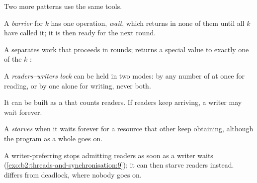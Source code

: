 Two more patterns use the same tools.

\begin{definition}[Barrier]\label{def:b2:threads-and-synchronisation:barrier}
A \emph{barrier} for $k$  has one operation, \emph{wait}, which returns in none of them until all
$k$ have called it; it is then ready for the next round.
\end{definition}

A  separates work that proceeds in rounds;  returns a special value to exactly one of
the $k$ :



\begin{definition}\label{def:b2:threads-and-synchronisation:rwlock}
A \emph{readers--writers lock} can be held in two modes: by any number of  at once
for reading, or by one  alone for writing, never both.
\end{definition}

It can be built as a  that counts readers. If readers keep arriving, a writer may wait forever.

\begin{definition}[Starvation]\label{def:b2:threads-and-synchronisation:starvation}
A  \emph{starves} when it waits forever for a resource that other  keep obtaining,
although the program as a whole goes on.
\end{definition}

A writer-preferring  stops admitting readers as soon as a writer waits (\cref{exo:b2:threads-and-synchronisation:9});
it can then starve readers instead.  differs from deadlock, where nobody goes on.

